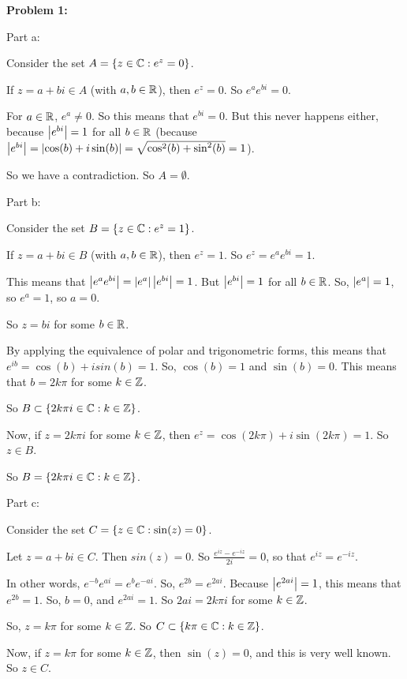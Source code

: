 \documentclass[a4paper,12pt]{article}
\begin{document}
{\bf Problem 1:}

Part a:

Consider the set $A= \{z \in \mathbb{C}: e^z = 0\}$.

If $z=a+bi \in A$ (with $a, b \in \mathbb{R}$), then $e^z =0$. So $e^ae^{bi} = 0$. 

For $a \in \mathbb{R}$, $e^a \neq 0$. So this means that $e^{bi} = 0$. But this never happens either, because $\left\lvert e^{bi} \right\rvert = 1$ for all $b \in \mathbb{R}$ (because $\left\lvert e^{bi} \right\rvert = \left\lvert \cos(b)+i\sin(b) \right\rvert = \sqrt{\cos^2(b) + \sin^2(b)} = 1$).

So we have a contradiction. So $A = \emptyset$.

\shunt

Part b:

Consider the set $B= \{z \in \mathbb{C}: e^z = 1\}$.

If $z=a+bi \in B$ (with $a,b \in \mathbb{R}$), then $e^z = 1$. So $e^z = e^ae^{bi} = 1$.

This means that $\left\lvert e^ae^{bi} \right\rvert = \left\lvert e^a \right\rvert\left\lvert e^{bi} \right\rvert= 1$. But $\left\lvert e^{bi} \right\rvert = 1$ for all $b \in \mathbb{R}$. So, $\left\lvert e^a \right\rvert = 1$, so $e^a = 1$, so $a = 0$.

So $z=bi$ for some $b \in \mathbb{R}$.

By applying the equivalence of polar and trigonometric forms, this means that $e^{ib} = \cos(b) + isin(b) = 1$. So, $\cos(b) =1$ and $\sin(b) = 0$. This means that $b = 2k \pi$ for some $k \in \mathbb{Z}$.

So $B \subset \{2k\pi i \in \mathbb{C}: k \in \mathbb{Z}\}$.

Now, if $z=2k\pi i$ for some $k \in \mathbb{Z}$, then $e^z = \cos(2k \pi ) + i \sin(2k \pi) =1$. So $z \in B$.

So $B = \{2k\pi i \in \mathbb{C}: k \in \mathbb{Z}\}$.

\shunt

Part c:

Consider the set $C= \{z \in \mathbb{C}: \sin(z) = 0\}$.

Let $z =a+bi \in C$. Then $sin(z) = 0$. So $\frac{e^{iz}-e^{-iz}}{2i} = 0$, so that $e^{iz} = e^{-iz}$.

In other words, $e^{-b}e^{ai} = e^{b}e^{-ai}$. So, $e^{2b} = e^{2ai}$. Because  $\left\lvert e^{2ai} \right\rvert = 1$, this means that $e^{2b} = 1$. So, $b=0$, and $e^{2ai}=1$. So $2ai = 2k\pi i $ for some $k \in \mathbb{Z}$.

So, $z=k \pi$ for some $k \in \mathbb{Z}$. So $C \subset \{k\pi  \in \mathbb{C}: k \in \mathbb{Z}\}$.

Now, if $z = k\pi$ for some $k \in \mathbb{Z}$, then $\sin(z) = 0$, and this is very well known. So $z \in C$.
\end{document}
